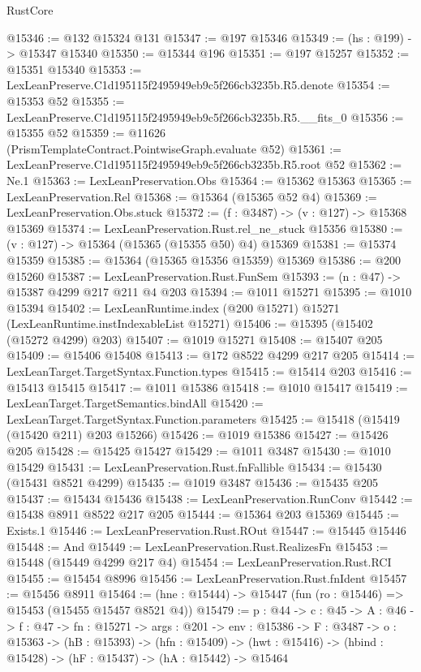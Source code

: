 \begin{lexlean}{RustCore}
\begin{coremodule}
@15346 := @132 @15324 @131
@15347 := @197 @15346
@15349 := (hs : @199) -> @15347 @15340
@15350 := @15344 @196
@15351 := @197 @15257
@15352 := @15351 @15340
@15353 := LexLeanPreserve.C1d195115f2495949eb9c5f266cb3235b.R5.denote
@15354 := @15353 @52
@15355 := LexLeanPreserve.C1d195115f2495949eb9c5f266cb3235b.R5.__fits_0
@15356 := @15355 @52
@15359 := @11626 (PrismTemplateContract.PointwiseGraph.evaluate @52)
@15361 := LexLeanPreserve.C1d195115f2495949eb9c5f266cb3235b.R5.root @52
@15362 := Ne.{1}
@15363 := LexLeanPreservation.Obs
@15364 := @15362 @15363
@15365 := LexLeanPreservation.Rel
@15368 := @15364 (@15365 @52 @4)
@15369 := LexLeanPreservation.Obs.stuck
@15372 := (f : @3487) -> (v : @127) -> @15368 @15369
@15374 := LexLeanPreservation.Rust.rel_ne_stuck @15356
@15380 := (v : @127) -> @15364 (@15365 (@15355 @50) @4) @15369
@15381 := @15374 @15359
@15385 := @15364 (@15365 @15356 @15359) @15369
@15386 := @200 @15260
@15387 := LexLeanPreservation.Rust.FunSem
@15393 := (n : @47) -> @15387 @4299 @217 @211 @4 @203
@15394 := @1011 @15271
@15395 := @1010 @15394
@15402 := LexLeanRuntime.index (@200 @15271) @15271 (LexLeanRuntime.instIndexableList @15271)
@15406 := @15395 (@15402 (@15272 @4299) @203)
@15407 := @1019 @15271
@15408 := @15407 @205
@15409 := @15406 @15408
@15413 := @172 @8522 @4299 @217 @205
@15414 := LexLeanTarget.TargetSyntax.Function.types
@15415 := @15414 @203
@15416 := @15413 @15415
@15417 := @1011 @15386
@15418 := @1010 @15417
@15419 := LexLeanTarget.TargetSemantics.bindAll
@15420 := LexLeanTarget.TargetSyntax.Function.parameters
@15425 := @15418 (@15419 (@15420 @211) @203 @15266)
@15426 := @1019 @15386
@15427 := @15426 @205
@15428 := @15425 @15427
@15429 := @1011 @3487
@15430 := @1010 @15429
@15431 := LexLeanPreservation.Rust.fnFallible
@15434 := @15430 (@15431 @8521 @4299)
@15435 := @1019 @3487
@15436 := @15435 @205
@15437 := @15434 @15436
@15438 := LexLeanPreservation.RunConv
@15442 := @15438 @8911 @8522 @217 @205
@15444 := @15364 @203 @15369
@15445 := Exists.{1}
@15446 := LexLeanPreservation.Rust.ROut
@15447 := @15445 @15446
@15448 := And
@15449 := LexLeanPreservation.Rust.RealizesFn
@15453 := @15448 (@15449 @4299 @217 @4)
@15454 := LexLeanPreservation.Rust.RCI
@15455 := @15454 @8996
@15456 := LexLeanPreservation.Rust.fnIdent
@15457 := @15456 @8911
@15464 := (hne : @15444) -> @15447 (fun (ro : @15446) => @15453 (@15455 @15457 @8521 @4))
@15479 := {p : @44} ->
  {c : @45} ->
  {A : @46} ->
  {f : @47} ->
  {fn : @15271} ->
  {args : @201} ->
  {env : @15386} ->
  {F : @3487} ->
  {o : @15363} ->
  (hB : @15393) ->
  (hfn : @15409) -> (hwt : @15416) -> (hbind : @15428) -> (hF : @15437) -> (hA : @15442) -> @15464

\end{coremodule}
\end{lexlean}
